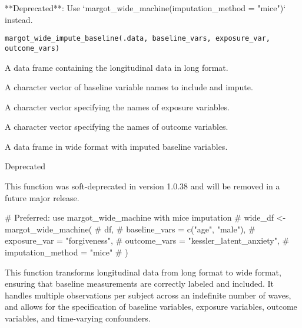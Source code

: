 \documentclass[a4paper]{book}
\begin{document}
%
\begin{Description}
**Deprecated**: Use `margot\_wide\_machine(imputation\_method = "mice")` instead.
\end{Description}
%
\begin{Usage}
\begin{verbatim}
margot_wide_impute_baseline(.data, baseline_vars, exposure_var, outcome_vars)
\end{verbatim}
\end{Usage}
%
\begin{Arguments}
\begin{ldescription}
\item[\code{.data}] A data frame containing the longitudinal data in long format.

\item[\code{baseline\_vars}] A character vector of baseline variable names to include and impute.

\item[\code{exposure\_var}] A character vector specifying the names of exposure variables.

\item[\code{outcome\_vars}] A character vector specifying the names of outcome variables.
\end{ldescription}
\end{Arguments}
%
\begin{Value}
A data frame in wide format with imputed baseline variables.
\end{Value}
%
\begin{Section}{Deprecated}

This function was soft-deprecated in version 1.0.38 and will be removed in a future major release.
\end{Section}
%
\begin{Examples}
\begin{ExampleCode}
# Preferred: use margot_wide_machine with mice imputation
# wide_df <- margot_wide_machine(
#   df,
#   baseline_vars = c("age", "male"),
#   exposure_var = "forgiveness",
#   outcome_vars = "kessler_latent_anxiety",
#   imputation_method = "mice"
# )

\end{ExampleCode}
\end{Examples}
%
\begin{Description}
This function transforms longitudinal data from long format to wide format,
ensuring that baseline measurements are correctly labeled and included.
It handles multiple observations per subject across an indefinite number of waves,
and allows for the specification of baseline variables, exposure variables,
outcome variables, and time-varying confounders.
\end{Description}
\end{document}
